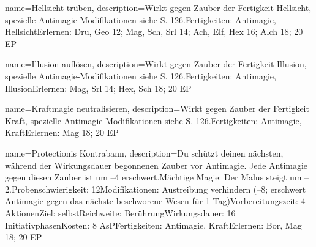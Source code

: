 {
    name={Hellsicht trüben},
    description={Wirkt gegen Zauber der Fertigkeit Hellsicht, spezielle Antimagie-Modifikationen siehe S. 126.\newline Fertigkeiten: Antimagie, Hellsicht\newline Erlernen: Dru, Geo 12; Mag, Sch, Srl 14; Ach, Elf, Hex 16; Alch 18; 20 EP}
}


{
    name={Illusion auflösen},
    description={Wirkt gegen Zauber der Fertigkeit Illusion, spezielle Antimagie-Modifikationen siehe S. 126.\newline Fertigkeiten: Antimagie, Illusion\newline Erlernen: Mag, Srl 14; Hex, Sch 18; 20 EP}
}


{
    name={Kraftmagie neutralisieren},
    description={Wirkt gegen Zauber der Fertigkeit Kraft, spezielle Antimagie-Modifikationen siehe S. 126.\newline Fertigkeiten: Antimagie, Kraft\newline Erlernen: Mag 18; 20 EP}
}


{
    name={Protectionis Kontrabann},
    description={Du schützt deinen nächsten, während der Wirkungsdauer begonnenen Zauber vor Antimagie. Jede Antimagie gegen diesen Zauber ist um –4 erschwert.\newline Mächtige Magie: Der Malus steigt um –2.\newline Probenschwierigkeit: 12\newline Modifikationen: Austreibung verhindern (–8; erschwert Antimagie gegen das nächste beschworene Wesen für 1 Tag)\newline Vorbereitungszeit: 4 Aktionen\newline Ziel: selbst\newline Reichweite: Berührung\newline Wirkungsdauer: 16 Initiativphasen\newline Kosten: 8 AsP\newline Fertigkeiten: Antimagie, Kraft\newline Erlernen: Bor, Mag 18; 20 EP}
}



